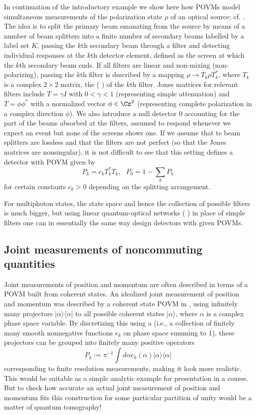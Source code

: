\documentclass[12pt]{article}
\begin{document}
In continuation of the introductory example we show here how
POVMs model simultaneous measurements of the polarization state $\rho$
of an optical source; cf.  \cite{Bra}.
The idea is to split the primary beam emanating from the source by
means of a number of beam splitters into a finite number of
secondary beams labelled by a label set $K$, passing the $k$th secondary
beam through a filter and detecting individual responses at the $k$th
detector element, defined as the screen at which the $k$th secondary
beam ends. If all filters are linear and non-mixing (non-polarizing),
passing the $k$th filter is described by a mapping
$\rho\to T_k\rho T_k^*$, where $T_k$ is a complex $2\times 2$ matrix,
the  ( \cite{Jon}) of the $k$th filter.
Jones matrices for relevant filters include $T=\gamma I$ with
$0<\gamma<1$ (representing simple attenuation) and $T=\phi\phi^*$ with
a normalized vector $\phi\in\Cz^2$ (representing complete polarization
in a complex direction $\phi$). We also introduce a null detector $0$
accounting for the part of the beams absorbed at the filters, assumed
to respond whenever we expect an event but none of the screens shows
one. If we assume that te beam splitters are lossless and that the 
filters are not perfect (so that the Jones matrices are nonsingular), 
it is not difficult to see that this setting defines a detector with 
POVM given by
\[
P_k=c_kT_k^*T_k,~~~P_0=1-\sum_k P_k
\]
for certain constants $c_k>0$ depending on the splitting arrangement.

For multiphoton states, the state space and hence the collection of
possible filters is much bigger, but using linear quantum-optical
networks ( \cite{LeoN}) in place of simple
filters one can in essentially the same way design detectors with given
POVMs.


\subsection{Joint measurements of noncommuting quantities}

Joint measurements of position and momentum are often described in
terms of a POVM built from coherent states.
An idealized joint measurement of position and momentum was described
by a coherent state POVM in  \cite{ArtK}, using
infinitely many projectors $|\alpha\rangle\langle\alpha|$ to all
possible coherent states $|\alpha\rangle$, where $\alpha$ is a complex
phase space variable. By discretizing this using a
 (i.e., a collection of finitely many smooth
nonnegative functions $e_k$ on phase space summing to 1),
these projectors can be grouped into finitely many positive operators
\[
P_k:=\pi^{-1}\int d\alpha e_k(\alpha)|\alpha\rangle\langle\alpha|
\]
corresponding to finite resolution measurements, making it look more
realistic. This would be suitable as a simple analytic example for
presentation in a course.
But to check how accurate an actual joint measurement of position and
momentum fits this construction for some particular partition of unity
would be a matter of quantum tomography!
\end{document}
